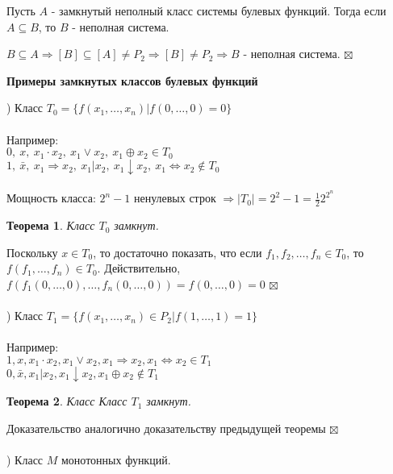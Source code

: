 \documentclass[a4paper, 12pt]{report}
\newcommand{\RomanNumeralCaps}[1]
    {\MakeUppercase{\romannumeral #1}}
\newenvironment{Proof} %
{\par\noindent{$\blacklozenge$}} %
{\hfill$\scriptstyle\boxtimes$} %
\newtheorem*{theorem}{Теорема} %
\begin{document}
Пусть $A$ - замкнутый неполный класс системы булевых функций. Тогда если $A \subseteq B$, то $B$ - неполная система.\\
\begin{Proof}
$B \subseteq A \Rightarrow [B] \subseteq [A] \neq P_2 \Rightarrow [B] \neq P_2 \Rightarrow B$ - неполная система.
\end{Proof}\\
\begin{center}
    \textbf{Примеры замкнутых классов булевых функций}
    \end{center}
\RomanNumeralCaps{1}) Класс $T_0 = \{f(x_1, \dots , x_n) | f(0, \dots, 0) = 0\}$\\\\
Например:\\
$0,~ x, ~x_1 \cdot x_2, ~x_1 \vee x_2, ~x_1 \oplus x_2 \in T_0$\\
$1, ~\bar x, ~ x_1 \Rightarrow x_2, ~ x_1 | x_2, ~ x_1 \downarrow x_2, ~ x_1 \Leftrightarrow x_2 \notin T_0$\\\\
Мощность класса: $2^n-1$ ненулевых строк $\Rightarrow |T_0| = 2^2-1 = \frac12 2^{2^n}$
\begin{theorem}
Класс $T_0$ замкнут.
\end{theorem}
\begin{Proof}
    Поскольку $x \in T_0$, то достаточно показать, что если $f_1, f_2, \dots, f_n \in T_0$, то $f(f_1, \dots, f_n) \in T_0$. Действительно, $f(f_1(0, \dots, 0), \dots, f_n(0, \dots, 0)) = f(0, \dots, 0)=0$ 
\end{Proof}\\\\
\RomanNumeralCaps{2}) Класс $T_1 = \{f(x_1, \dots, x_n) \in P_2 | f(1, \dots, 1) = 1\}$\\\\
Например:\\
$1, x, x_1 \cdot x_2, x_1 \vee x_2, x_1 \Rightarrow x_2, x_1 \Leftrightarrow x_2 \in T_1$\\
$0, \bar x, x_1|x_2, x_1 \downarrow x_2, x_1 \oplus x_2 \notin T_1$
\begin{theorem}
Класс Класс $T_1$ замкнут.
\end{theorem}
\begin{Proof}
Доказательство аналогично доказательству предыдущей теоремы 
\end{Proof}\\\\
\RomanNumeralCaps{3}) Класс $M$ монотонных функций.\\\\
\end{document}
